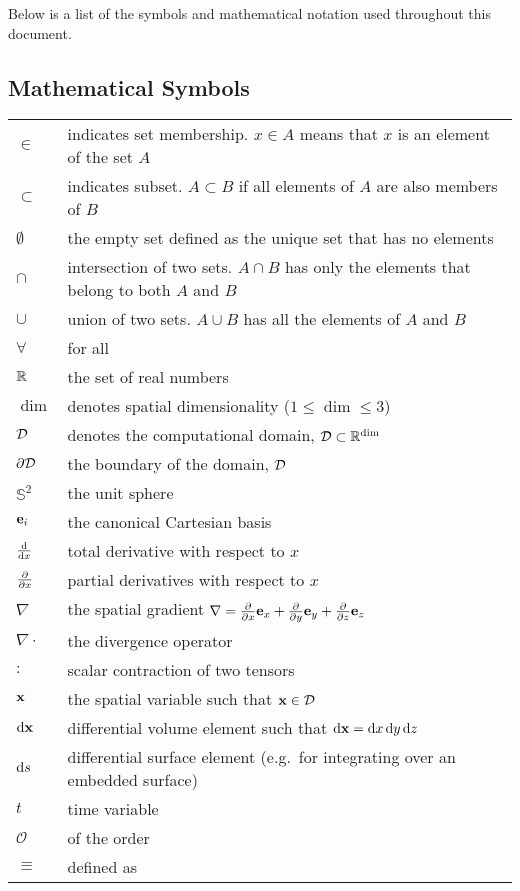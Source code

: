 \documentclass[../doc.tex]{subfiles}
\begin{document}
\renewcommand{\arraystretch}{1.1}
Below is a list of the symbols and mathematical notation used throughout this document. 

\subsection*{Mathematical Symbols}
\begin{longtable}{p{2cm}p{12cm}}
$\in$ & indicates set membership. $x \in A$ means that $x$ is an element of the set $A$\\
$\subset$ & indicates subset. $A \subset B$ if all elements of $A$ are also members of $B$ \\
$\emptyset$ & the empty set defined as the unique set that has no elements \\
$\cap$ & intersection of two sets. $A\cap B$ has only the elements that belong to both $A$ and $B$ \\
$\cup$ & union of two sets. $A\cup B$ has all the elements of $A$ and $B$ \\
$\forall$ & for all \\
$\mathbb{R}$ & the set of real numbers \\
$\dim$ & denotes spatial dimensionality ($1\leq \dim \leq 3$) \\
$\mathcal{D}$ & denotes the computational domain, $\mathcal{D} \subset \mathbb{R}^{\dim}$\\ 
$\partial\mathcal{D}$ & the boundary of the domain, $\mathcal{D}$ \\
$\mathbb{S}^2$ & the unit sphere \\
$\boldsymbol{\mathrm{e}}_i$ & the canonical Cartesian basis \\
$\frac{\mathop{}\!\mathrm{d} }{\mathop{}\!\mathrm{d} x}$ & total derivative with respect to $x$ \\
$\frac{\partial }{\partial x}$ & partial derivatives with respect to $x$ \\
$\nabla$ & the spatial gradient $\nabla = \frac{\partial }{\partial x} \boldsymbol{\mathrm{e}}_x + \frac{\partial }{\partial y}\boldsymbol{\mathrm{e}}_y + \frac{\partial }{\partial z}\boldsymbol{\mathrm{e}}_z$ \\
$\nabla\cdot$ & the divergence operator \\
$:$ & scalar contraction of two tensors \\
$\boldsymbol{\mathrm{x}}$ & the spatial variable such that $\boldsymbol{\mathrm{x}} \in \mathcal{D}$ \\
$\mathop{}\!\mathrm{d}\boldsymbol{\mathrm{x}}$ & differential volume element such that $\mathop{}\!\mathrm{d}\boldsymbol{\mathrm{x}} = \mathop{}\!\mathrm{d} x \mathop{}\!\mathrm{d} y \mathop{}\!\mathrm{d} z$ \\ 
$\mathop{}\!\mathrm{d} s$ & differential surface element (e.g.~for integrating over an embedded surface) \\
$t$ & time variable \\
$\mathcal{O}$ & of the order \\
$\equiv$ & defined as \\
\end{longtable}
\end{document}

